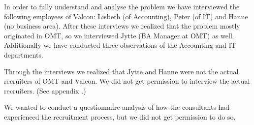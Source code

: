 In order to fully understand and analyse the problem we have interviewed the following employees of Valcon:
Lisbeth (of Accounting), Peter (of IT) and Hanne (no business area).
After these interviews we realized that the problem mostly originated in OMT, so we interviewed Jytte (BA Manager at OMT) as well.
Additionally we have conducted three observations of the Accounting and IT departments.

Through the interviews we realized that Jytte and Hanne were not the actual recruiters of OMT and Valcon.
We did not get permission to interview the actual recruiters.
(See appendix .)

We wanted to conduct a questionnaire analysis of how the consultants had experienced the recruitment process, but we did not get permission to do so.